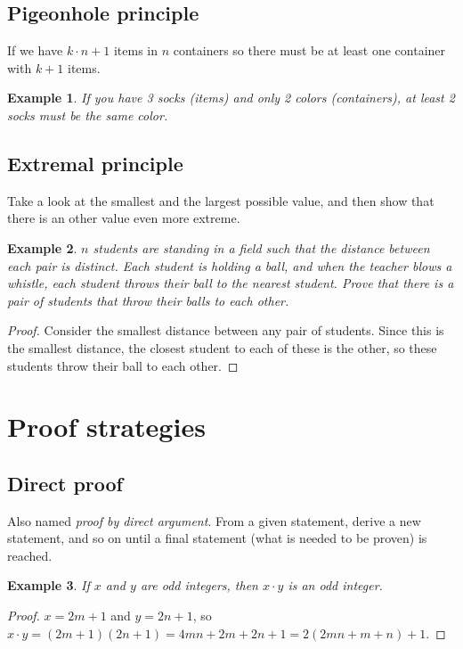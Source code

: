 \documentclass[11pt]{article}
\newtheorem{theorem}{Example}
\begin{document}
\subsection{Pigeonhole principle}

If we have $k \cdot n+1$ items in $n$ containers so there must be at least one container with $k+1$ items.

\begin{theorem}
  If you have 3 socks (items) and only 2 colors (containers), at least 2 socks must be the same color. 
\end{theorem}

\subsection{Extremal principle} 

Take a look at the smallest and the largest possible value, and then show that there is an other value even more extreme.

\begin{theorem}
  $n$ students are standing in a field such that the distance between each pair is distinct. Each student is holding a ball, and when the teacher blows a whistle, each student throws their ball to the nearest student. Prove that there is a pair of students that throw their balls to each other.
\end{theorem}
\begin{proof}
  Consider the smallest distance between any pair of students. Since this is the smallest distance, the closest student to each of these is the other, so these students throw their ball to each other. 
\end{proof}

\section{Proof strategies}

\subsection{Direct proof}

Also named \emph{proof by direct argument}. From a given statement, derive a new statement, and so on until a final statement (what is needed to be proven) is reached.

\begin{theorem}
  If $x$ and $y$ are odd integers, then $x \cdot y$ is an odd integer.
\end{theorem}
\begin{proof}
  $x = 2m + 1$ and $y = 2n + 1$, so $x \cdot y = (2m + 1)(2n +1) = 4mn + 2m + 2n + 1 = 2(2mn + m + n) + 1$.
\end{proof}
\end{document}
